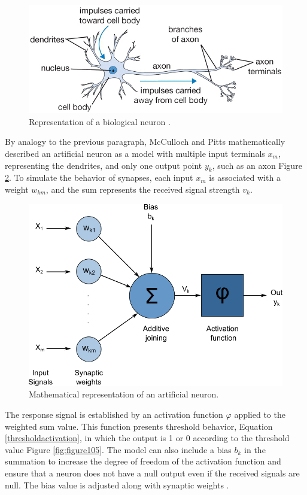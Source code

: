 \begin{figure}
    \centering
    \includegraphics[scale=0.4]{images/figure103.png}
    \caption{Representation of a biological neuron \cite{img:neuronCS}.}
    \label{fig:figure103}
\end{figure}

By analogy to the previous paragraph, McCulloch and Pitts mathematically described an artificial neuron as a model with multiple input terminals $x_m$, representing the dendrites, and only one output point $y_k$, such as an axon Figure \ref{fig:figure104}. To simulate the behavior of synapses, each input $x_m$ is associated with a weight $w_{km}$, and the sum represents the received signal strength $v_k$.

\begin{figure}
    \centering
    \includegraphics[scale=0.7]{images/figure104.png}
    \caption{Mathematical representation of an artificial neuron.}
    \label{fig:figure104}
\end{figure}

The response signal is established by an activation function $\varphi$ applied to the weighted sum value. This function presents threshold behavior, Equation \ref{thresholdactivation}, in which the output is 1 or 0 according to the threshold value Figure \ref{fig:figure105}. The model can also include a bias $b_k$ in the summation to increase the degree of freedom of the activation function and ensure that a neuron does not have a null output even if the received signals are null. The bias value is adjusted along with synaptic weights \cite{haykin1999}.

